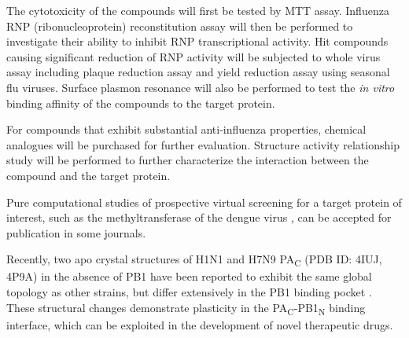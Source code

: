 The cytotoxicity of the compounds will first be tested by MTT assay. Influenza RNP (ribonucleoprotein) reconstitution assay will then be performed to investigate their ability to inhibit RNP transcriptional activity. Hit compounds causing significant reduction of RNP activity will be subjected to whole virus assay including plaque reduction assay and yield reduction assay using seasonal flu viruses. Surface plasmon resonance will also be performed to test the \textit{in vitro} binding affinity of the compounds to the target protein. 

For compounds that exhibit substantial anti-influenza properties, chemical analogues will be purchased for further evaluation. Structure activity relationship study will be performed to further characterize the interaction between the compound and the target protein.

Pure computational studies of prospective virtual screening for a target protein of interest, such as the methyltransferase of the dengue virus \citep{1435}, can be accepted for publication in some journals.

Recently, two apo crystal structures of H1N1 and H7N9 PA\textsubscript{C} (PDB ID: 4IUJ, 4P9A) in the absence of PB1 have been reported to exhibit the same global topology as other strains, but differ extensively in the PB1 binding pocket \citep{1585}. These structural changes demonstrate plasticity in the PA\textsubscript{C}-PB1\textsubscript{N} binding interface, which can be exploited in the development of novel therapeutic drugs.

\chapterend
